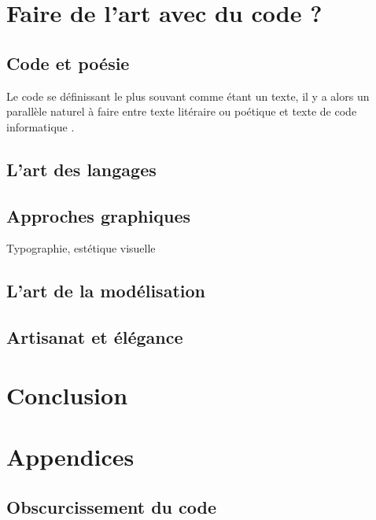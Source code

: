 \documentclass[12pt]{article} %
\begin{document}
\section{Faire de l'art avec du code ?}

\subsection{Code et poésie}
Le code se définissant le plus souvant comme étant un texte, il y a alors un parallèle naturel à faire entre texte litéraire ou poétique et texte de code informatique \cite{FCramer2001}.

\subsection{L'art des langages}
\subsection{Approches graphiques}
Typographie, estétique visuelle

\subsection{L'art de la modélisation}
\subsection{Artisanat et élégance}




\section{Conclusion}

\newpage
\section{Appendices}

\subsection{Obscurcissement du code}



\printglossary[type=\acronymtype]

\printglossary


\newpage



\restoregeometry
\end{document}

